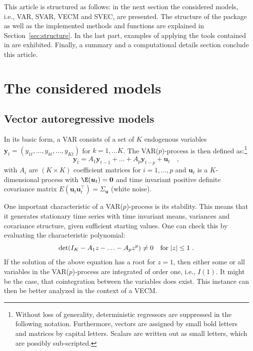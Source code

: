 \documentclass[nojss]{jss}
\begin{document}
This article is structured as follows: in the next section the
considered models, i.e., VAR, SVAR, VECM and SVEC, are presented. The
structure of the package as well as the implemented methods and
functions are explained in Section~\ref{sec:structure}. In the last
part, examples of applying the tools contained in  are
exhibited. Finally, a summary and a computational details section
conclude this article. 
\section{The considered models}
\label{sec:models}
\subsection{Vector autoregressive models}
\label{subsec:var}
In its basic form, a VAR consists of a set of $K$ endogenous variables
$\bm{y}_t = (y_{1t}, \ldots, y_{kt}, \ldots, y_{Kt})$ for $k = 1,
\ldots K$. The VAR($p$)-process is then defined as:\footnote{Without
  loss of generality, deterministic regressors are suppressed in the
  following notation. Furthermore, vectors are assigned by small bold
  letters and matrices by capital letters. Scalars are written out as
  small letters, which are possibly sub-scripted.} 
\begin{equation}
\label{eq1}
\bm{y}_t = A_1 \bm{y}_{t-1} + \ldots + A_p \bm{y}_{t-p} +
\bm{u}_t \quad , 
\end{equation}
with $A_i$ are $(K \times K)$ coefficient matrices for $i = 1, \ldots,
p$ and $\bm{u}_t$ is a $K$-dimensional process with
$\E(\bm{u}_t) = \bm{0}$ and time invariant positive definite
covariance matrix $E(\bm{u}_t \bm{u}_t^\top) =
\Sigma_{\bm{u}}$ (white noise).

One important characteristic of a VAR($p$)-process is its
stability. This means that it generates stationary time series with
time invariant means, variances and covariance structure, given
sufficient starting values. One can check this by evaluating the
characteristic polynomial:  
\begin{equation}
\label{eq2}
\det(I_K - A_1 z - \ldots - A_p z^p) \neq 0 \quad \hbox{for} \; |z| \le 1 \;.
\end{equation} 
If the solution of the above equation has a root for $z = 1$, then
either some or all variables in the VAR($p$)-process are integrated of
order one, i.e., $I(1)$. It might be the case, that cointegration
between the variables does exist. This instance can then be better
analyzed in the context of a VECM.
\end{document}
